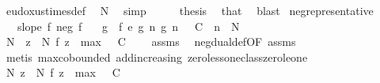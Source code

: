 \begin{isabellebody}
\ eudoxus{\isacharunderscore}{\kern0pt}times{\isacharunderscore}{\kern0pt}def\ \isamarkupfalse%
\ N{\isacharprime}{\kern0pt}\ \isamarkupfalse%
\ simp\isanewline
\ \ \isamarkupfalse%
\ \isamarkupfalse%
\ {\isacharquery}{\kern0pt}thesis\ \isamarkupfalse%
\ that\ \isamarkupfalse%
\ blast\isanewline
{}\isamarkupfalse%
%
\endisatagproof
{\isafoldproof}%
%
\isadelimproof
\isanewline
%
\endisadelimproof
\isanewline
{}\isamarkupfalse%
\ neg{\isacharunderscore}{\kern0pt}representative{\isacharprime}{\kern0pt}{\isacharcolon}{\kern0pt}\isanewline
\ \ \ {\isachardoublequoteopen}slope\ f{\isachardoublequoteclose}\ {\isachardoublequoteopen}neg\ f{\isachardoublequoteclose}\isanewline
\ \ \ g\ \ {\isachardoublequoteopen}f\ {\isasymsim}\isactrlsub e\ g{\isachardoublequoteclose}\ {\isachardoublequoteopen}{\isasymAnd}n{\isachardot}{\kern0pt}\ g\ n\ {\isasymle}\ {\isacharminus}{\kern0pt}\ C\ {\isasymLongrightarrow}\ n\ {\isasymge}\ N{\isachardoublequoteclose}\isanewline
%
\isadelimproof
%
\endisadelimproof
%
\isatagproof
{}\isamarkupfalse%
\ {\isacharminus}{\kern0pt}\isanewline
\ \ \isamarkupfalse%
\ N{\isacharprime}{\kern0pt}\ \ {\isachardoublequoteopen}{\isasymforall}z\ {\isasymle}\ N{\isacharprime}{\kern0pt}{\isachardot}{\kern0pt}\ f\ z\ {\isasymge}\ max\ {}\ {\isacharparenleft}{\kern0pt}{\isacharminus}{\kern0pt}\ C{\isacharparenright}{\kern0pt}\ {\isacharplus}{\kern0pt}\ {}{\isachardoublequoteclose}\ \isamarkupfalse%
\ assms\ \isamarkupfalse%
\ neg{\isacharunderscore}{\kern0pt}dual{\isacharunderscore}{\kern0pt}def{\isacharbrackleft}{\kern0pt}OF\ assms{\isacharparenleft}{\kern0pt}{}{\isacharparenright}{\kern0pt}{\isacharbrackright}{\kern0pt}\ \isamarkupfalse%
\ {\isacharparenleft}{\kern0pt}metis\ max{\isachardot}{\kern0pt}cobounded{}\ add{\isacharunderscore}{\kern0pt}increasing{}\ zero{\isacharunderscore}{\kern0pt}less{\isacharunderscore}{\kern0pt}one{\isacharunderscore}{\kern0pt}class{\isachardot}{\kern0pt}zero{\isacharunderscore}{\kern0pt}le{\isacharunderscore}{\kern0pt}one{\isacharparenright}{\kern0pt}\isanewline
\ \ \isamarkupfalse%
\ N{\isacharprime}{\kern0pt}{\isacharcolon}{\kern0pt}\ {\isachardoublequoteopen}{\isasymforall}z\ {\isasymle}\ N{\isacharprime}{\kern0pt}{\isachardot}{\kern0pt}\ f\ z\ {\isachargreater}{\kern0pt}\ max\ {}\ {\isacharparenleft}{\kern0pt}{\isacharminus}{\kern0pt}\ C{\isacharparenright}{\kern0pt}{\isachardoublequoteclose}\ \isamarkupfalse%

\end{isabellebody}
